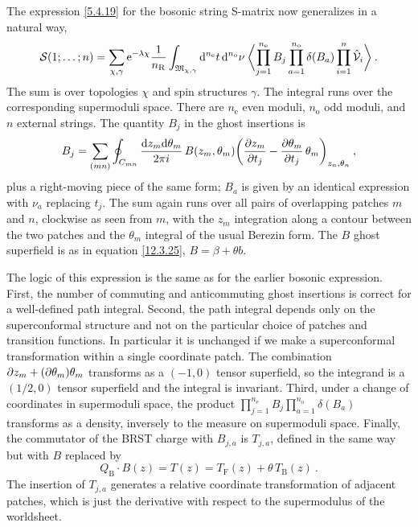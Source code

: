 The expression \eqref{5.4.19} for the bosonic string S-matrix now generalizes in a natural way,
\begin{equation}
	\mathcal{S}(1;\dots;n) = \sum_{\chi,\gamma}\mathrm{e}^{-\lambda\chi}\frac{1}{n_{\mathrm{R}}}\int_{\mathfrak{M}_{\chi,\gamma}}\mathrm{d}^{n_{\mathrm{e}}}t\,\mathrm{d}^{n_{\mathrm{o}}}\nu\:\biggl\langle \prod_{j=1}^{n_{\mathrm{e}}}B_{j}\prod_{a=1}^{n_{\mathrm{o}}}\delta(B_{a})\prod_{i=1}^{n}\hat{\mathcal{V}}_{i}\biggr\rangle \:. \label{12.5.24}
\end{equation}
The sum is over topologies $\chi$ and spin structures $\gamma$. The integral runs over the corresponding supermoduli space. There are $n_{\mathrm{e}}$ even moduli, $n_{\mathrm{o}}$ odd moduli, and $n$ external strings. The quantity $B_j$ in the ghost insertions is
\begin{equation}
	B_{j} = \sum_{(mn)}\oint_{C_{mn}}\frac{\mathrm{d} z_m\mathrm{d}\theta_m}{2\pi i}\,B(z_m,\theta_m)\biggl(\frac{\partial z_m}{\partial t_j} - \frac{\partial\theta_m}{\partial t_j}\,\theta_m\biggr)_{z_n,\theta_n} \:, \label{12.5.25}
\end{equation}
plus a right-moving piece of the same form; $B_a$ is given by an identical expression with $\nu_a$ replacing $t_j$. The sum again runs over all pairs of overlapping patches $m$ and $n$, clockwise as seen from $m$, with the $z_m$ integration along a contour between the two patches and the $\theta_m$ integral of the usual Berezin form. The $B$ ghost superfield is as in equation \eqref{12.3.25}, $B = \beta + \theta b$.

The logic of this expression is the same as for the earlier bosonic expression. First, the number of commuting and anticommuting ghost insertions is correct for a well-defined path integral. Second, the path integral depends only on the superconformal structure and not on the particular choice of patches and transition functions. In particular it is unchanged if we make a superconformal transformation within a single coordinate patch. The combination $\partial z_m + (\partial\theta_m)\theta_m$ transforms as a $(-1,0)$ tensor superfield, so the integrand is a $(1/2,0)$ tensor superfield and the integral is invariant. Third, under a change of coordinates in supermoduli space, the product $\prod_{j=1}^{n_{\mathrm{e}}}B_j \prod_{a=1}^{n_{\mathrm{o}}}\delta(B_a)$ transforms as a density, inversely to the measure on supermoduli space. Finally, the commutator of the BRST charge with $B_{j,a}$ is $T_{j,a}$, defined in the same way but with $B$ replaced by
\begin{equation}
	Q_{\mathrm{B}}\cdot B(z) = T(z) = T_{\mathrm{F}}(z) + \theta\,T_{\mathrm{B}}(z) \:. \label{12.5.26}
\end{equation}
The insertion of $T_{j,a}$ generates a relative coordinate transformation of adjacent patches, which is just the derivative with respect to the supermodulus of the worldsheet.

